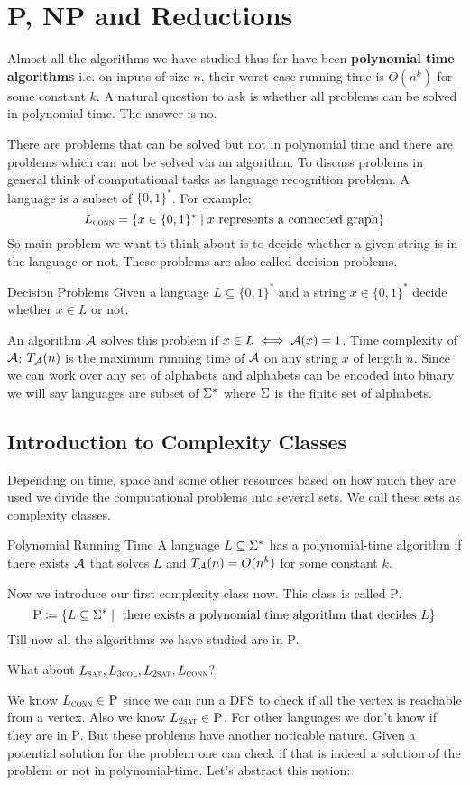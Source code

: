 \chapter{\textsc{P, NP} and Reductions}
Almost all the algorithms we have studied thus far have been \textbf{polynomial time algorithms} i.e. on inputs of size $n$, their worst-case running time is $O(n^k)$ for some constant $k$. A natural question to ask is whether all problems can be solved in polynomial time. The answer is no.

There are problems that can be solved but not in polynomial time and there are problems which can not be solved via an algorithm. To discuss problems in general think of computational tasks as language recognition problem. A language is a subset of $\{0,1\}^*$. For example: $$L_{\textsc{conn}}=\{x\in\{0,1\}^*\mid x\text{ represents a connected graph}\}$$So main problem we want to think about is to decide whether a given string is in the language or not. These problems are also called decision problems.
\begin{definition}{Decision Problems}{}
    Given a language $L\subseteq \{0,1\}^*$ and a string $x\in\{0,1\}^*$ decide whether $x\in L$ or not.
\end{definition}    An algorithm $\mathcal{A}$ solves this problem if $x\in L\iff \mathcal{A}(x)=1$. Time complexity of $\mathcal{A}$: $T_{\mathcal{A}}(n)$ is the maximum running time of $\mathcal{A}$ on any string $x$ of length $n$. Since we can work over any set of alphabets and alphabets can  be encoded into binary we will say languages are subset of $\Sigma^*$ where $\Sigma$ is the finite set of alphabets. 
\section{Introduction to Complexity Classes}
Depending on time, space and some other resources based on how much they are used we divide the computational problems into several sets. We call these sets as complexity classes.

\begin{Definition}{Polynomial Running Time}{}
    A language $L\subseteq\Sigma^*$ has a polynomial-time algorithm if there exists $\mathcal{A}$ that solves $L$ and $T_{\mathcal{A}}(n)=O(n^k)$ for some constant $k$.
\end{Definition}
Now we introduce our first complexity class now. This class is called \textsc{P}. $$\textsc{P}\coloneqq \{L\subseteq \Sigma^*\mid \text{ there exists a polynomial time algorithm that decides $L$}\}$$ Till now all the algorithms we have studied are in \textsc{P}.
\begin{question}{}{}
    What about $L_{\textsc{sat}}, L_{\textsc{3col}}, L_{\textsc{2sat}}, L_{\textsc{conn}}$?
\end{question}We know $L_{\textsc{conn}}\in \textsc{P}$ since we can run a \textsc{DFS} to check if all the vertex is reachable from a vertex. Also we know $L_{\textsc{2sat}}\in \textsc{P}$. For other languages we don't know if they are in \textsc{P}. But these problems have another noticable nature. Given a potential solution for the problem one can check if that is indeed a solution of the problem or not in polynomial-time. Let's abstract this notion:

